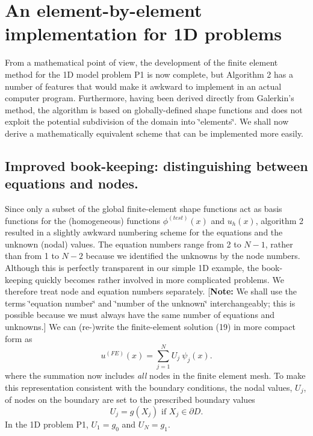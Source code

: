 \hypertarget{index_implementation}{}\section{An element-\/by-\/element implementation for 1\-D problems}\label{index_implementation}
From a mathematical point of view, the development of the finite element method for the 1\-D model problem P1 is now complete, but Algorithm 2 has a number of features that would make it awkward to implement in an actual computer program. Furthermore, having been derived directly from Galerkin's method, the algorithm is based on globally-\/defined shape functions and does not exploit the potential subdivision of the domain into \char`\"{}elements\char`\"{}. We shall now derive a mathematically equivalent scheme that can be implemented more easily.\hypertarget{index_book_keeping}{}\subsection{Improved book-\/keeping\-: distinguishing between equations and nodes.}\label{index_book_keeping}
Since only a subset of the global finite-\/element shape functions act as basis functions for the (homogeneous) functions $ \phi^{(test)}(x)$ and $ u_h(x)$, algorithm 2 resulted in a slightly awkward numbering scheme for the equations and the unknown (nodal) values. The equation numbers range from 2 to $N-1$, rather than from 1 to $N-2$ because we identified the unknowns by the node numbers. Although this is perfectly transparent in our simple 1\-D example, the book-\/keeping quickly becomes rather involved in more complicated problems. We therefore treat node and equation numbers separately. \mbox{[}{\bfseries Note\-:} We shall use the terms \char`\"{}equation number\char`\"{} and \char`\"{}number of the unknown\char`\"{} interchangeably; this is possible because we must always have the same number of equations and unknowns.\mbox{]} We can (re-\/)write the finite-\/element solution (19) in more compact form as \[ u^{(FE)}(x) =\sum_{j=1}^{N} U_j \ \psi_j(x). \] where the summation now includes {\itshape all} nodes in the finite element mesh. To make this representation consistent with the boundary conditions, the nodal values, $U_j$, of nodes on the boundary are set to the prescribed boundary values \[ U_j = g(X_j) \mbox{\ \ \ if $X_j\in \partial D$}.\] In the 1\-D problem P1, $U_1=g_0$ and $U_N=g_1$.

